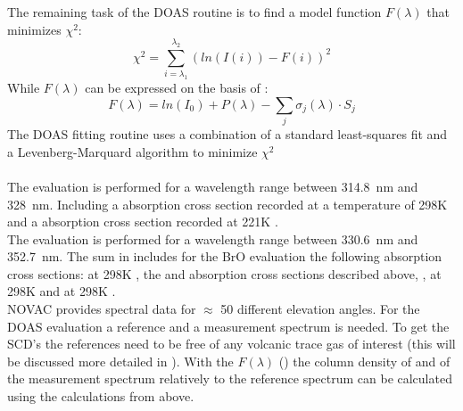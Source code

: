 The remaining task of the DOAS routine is to find a model function $F \left(\lambda\right)$ that minimizes $\chi^2$:
\begin{equation}
\chi^2 = \sum_{i=\lambda_1}^{\lambda_2}\left(ln(I(i))-F(i)\right)^2
\end{equation}
While $F\left(\lambda\right)$ can be expressed on the basis of :
\begin{equation}
F\left(\lambda\right) = ln\left(I_0 \right) + P \left(\lambda\right)-
\sum_{j}\sigma_j \left(\lambda\right) \cdot S_j
\label{eq:F}
\end{equation}
The DOAS fitting routine uses a combination of a standard least-squares fit and a Levenberg-Marquard algorithm to minimize $\chi^2$\\
\\
The  evaluation is performed for a wavelength range between 314.8~nm and 328~nm. Including a  absorption cross section recorded at a temperature of 298K \cite{vandaele2009fourier} and a   absorption cross section recorded at 221K \cite{burrows1999atmospheric}.\\
The   evaluation is performed for a wavelength range between 330.6~nm and 352.7~nm. The sum in  includes for the BrO evaluation the following absorption cross sections:
  at 298K \cite{fleischmann2004new}, the  and   absorption cross sections described above,  \cite{hermans2003absorption},   at 298K \cite{vandaele1998measurements} and   at 298K \cite{meller2000temperature}.\\
%
NOVAC provides spectral data for $\approx$ 50 different elevation angles. For the DOAS evaluation a reference and a measurement spectrum is needed. To get the SCD's the references need to be free of any volcanic trace gas of interest (this will be discussed more detailed in ). With the $F\left(\lambda\right)$ () the column density of    and  of the measurement spectrum relatively to the reference spectrum can be calculated using the calculations from above. \\
\\
